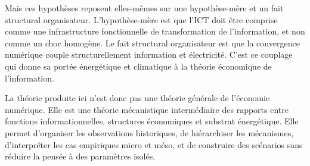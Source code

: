 Mais ces hypothèses reposent elles-mêmes sur une hypothèse-mère et un fait structural organisateur. L'hypothèse-mère est que l'ICT doit être comprise comme une infrastructure fonctionnelle de transformation de l'information, et non comme un choc homogène. Le fait structural organisateur est que la convergence numérique couple structurellement information et électricité. C'est ce couplage qui donne sa portée énergétique et climatique à la théorie économique de l'information.

La théorie produite ici n'est donc pas une théorie générale de l'économie numérique. Elle est une théorie mécanistique intermédiaire des rapports entre fonctions informationnelles, structures économiques et substrat énergétique. Elle permet d'organiser les observations historiques, de hiérarchiser les mécanismes, d'interpréter les cas empiriques micro et méso, et de construire des scénarios sans réduire la pensée à des paramètres isolés.
